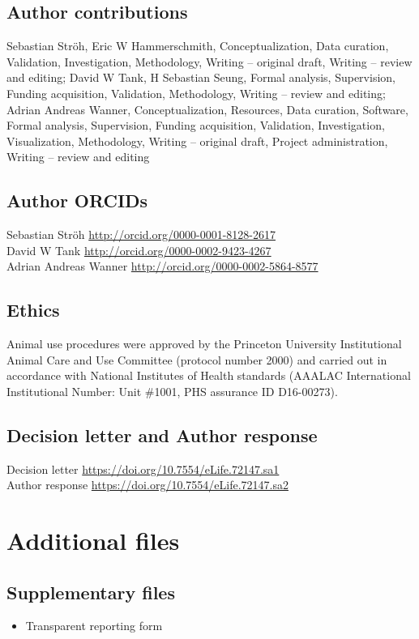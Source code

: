 \documentclass{article}
\begin{document}
\subsection*{Author contributions}
Sebastian Ströh, Eric W Hammerschmith, Conceptualization, Data curation, Validation, Investigation, Methodology, Writing – original draft, Writing – review and editing; David W Tank, H Sebastian Seung, Formal analysis, Supervision, Funding acquisition, Validation, Methodology, Writing – review and editing; Adrian Andreas Wanner, Conceptualization, Resources, Data curation, Software, Formal analysis, Supervision, Funding acquisition, Validation, Investigation, Visualization, Methodology, Writing – original draft, Project administration, Writing – review and editing

\subsection*{Author ORCIDs}
\noindent Sebastian Ströh \url{http://orcid.org/0000-0001-8128-2617}\\
David W Tank \url{http://orcid.org/0000-0002-9423-4267}\\
Adrian Andreas Wanner \url{http://orcid.org/0000-0002-5864-8577}

\subsection*{Ethics}
Animal use procedures were approved by the Princeton University Institutional Animal Care and Use Committee (protocol number 2000) and carried out in accordance with National Institutes of Health standards (AAALAC International Institutional Number: Unit \#1001, PHS assurance ID D16-00273).

\subsection*{Decision letter and Author response}
\noindent Decision letter \url{https://doi.org/10.7554/eLife.72147.sa1}\\
Author response \url{https://doi.org/10.7554/eLife.72147.sa2}

\section*{Additional files}
\subsection*{Supplementary files}
\begin{itemize}
\item Transparent reporting form
\end{itemize}
\end{document}
